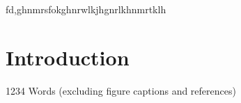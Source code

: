 \documentclass{physics_article_B}
\author{Oliver Dudgeon \and Adam Shaw \and Joseph Parker}
\date{\today}
\begin{document}
\maketitle
fd,ghnmrsfokghnrwlkjhgnrlkhnmrtklh
\begin{abstract}

\end{abstract}

\section{Introduction}



\newpage
\printbibliography

1234 Words (excluding figure captions and references)
\end{document}
